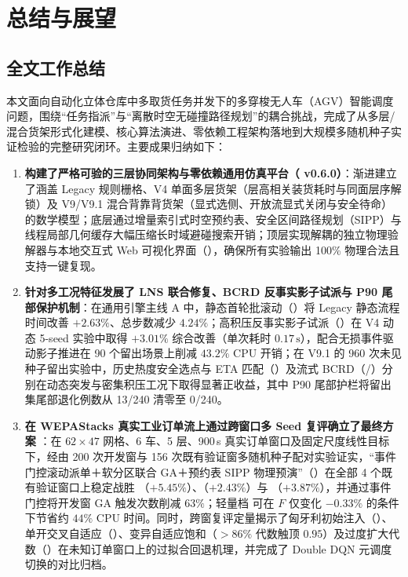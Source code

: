 \section{总结与展望}
\label{sec:conclusion}

\subsection{全文工作总结}

本文面向自动化立体仓库中多取货任务并发下的多穿梭无人车（AGV）智能调度问题，围绕“任务指派”与“离散时空无碰撞路径规划”的耦合挑战，完成了从多层/混合货架形式化建模、核心算法演进、零依赖工程架构落地到大规模多随机种子实证检验的完整研究闭环。主要成果归纳如下：

\begin{enumerate}
  \item \textbf{构建了严格可验的三层协同架构与零依赖通用仿真平台（ v0.6.0）}：渐进建立了涵盖 Legacy 规则栅格、V4 单面多层货架（层高相关装货耗时与同面层序解锁）及 V9/V9.1 混合背靠背货架（显式选侧、开放流显式关闭与安全待命）的数学模型；底层通过增量索引式时空预约表、安全区间路径规划（SIPP）与线程局部几何缓存大幅压缩长时域避碰搜索开销；顶层实现解耦的独立物理验解器与本地交互式 Web 可视化界面（），确保所有实验输出 100\% 物理合法且支持一键复现。
  \item \textbf{针对多工况特征发展了 LNS 联合修复、BCRD 反事实影子试派与 P90 尾部保护机制}：在通用引擎主线 A 中，静态首轮批滚动（）将 Legacy 静态流程时间改善 $+2.63\%$、总步数减少 $4.24\%$；高积压反事实影子试派（）在 V4 动态 5-seed 实验中取得 $+3.01\%$ 综合改善（单次耗时 $0.17\,\text{s}$），配合无损事件驱动影子推进在 90 个留出场景上削减 $43.2\%$ CPU 开销；在 V9.1 的 960 次未见种子留出实验中，历史热度安全选点与 ETA 匹配（）及流式 BCRD（/）分别在动态突发与密集积压工况下取得显著正收益，其中 P90 尾部护栏将留出集尾部退化例数从 13/240 清零至 0/240。
  \item \textbf{在 WEPAStacks 真实工业订单流上通过跨窗口多 Seed 复评确立了最终方案 }：在 $62\times 47$ 网格、6 车、5 层、900\,s 真实订单窗口及固定尺度线性目标下，经由 200 次开发窗与 156 次既有验证窗多随机种子配对实验证实，“事件门控滚动派单＋软分区联合 GA＋预约表 SIPP 物理预演”（）在全部 4 个既有验证窗口上稳定战胜 （$+5.45\%$）、（$+2.43\%$）与 （$+3.87\%$），并通过事件门控将开发窗 GA 触发次数削减 $63\%$；轻量档  可在 $F$ 仅变化 $-0.33\%$ 的条件下节省约 $44\%$ CPU 时间。同时，跨窗复评定量揭示了匈牙利初始注入（）、单开交叉自适应（）、变异自适应饱和（$>86\%$ 代数触顶 $0.95$）及过度扩大代数（）在未知订单窗口上的过拟合回退机理，并完成了 Double DQN 元调度切换的对比归档。
\end{enumerate}

